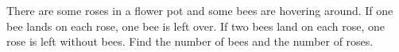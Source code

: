 There are some roses in a flower pot and some bees are hovering around. If one bee lands on each rose, one bee is left over. If two bees land on each rose, one rose is left without bees. Find the number of bees and the number of roses.
